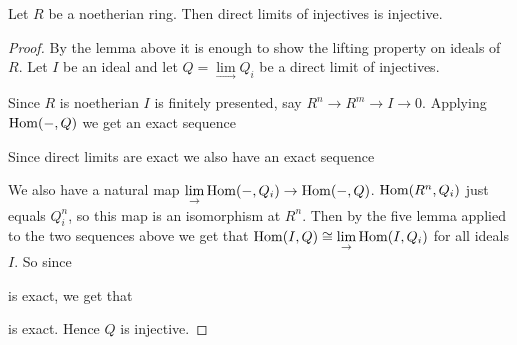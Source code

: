 \begin{theorem}\cite[Chapter I, Exercise 8]{CE56}
	Let $R$ be a noetherian ring. Then direct limits of injectives is injective.
	\begin{proof}
		By the lemma above it is enough to show the lifting property on ideals of $R$. Let $I$ be an ideal and let $Q = \lim\limits_{\rightarrow} Q_i$ be a direct limit of injectives.
		
		Since $R$ is noetherian $I$ is finitely presented, say $R^n \to R^m \to I \to 0$. Applying $\operatorname{Hom}(-,Q)$ we get an exact sequence 
		\begin{center}
		\end{center}
		Since direct limits are exact we also have an exact sequence
		\begin{center}
		\end{center}
		We also have a natural map $\lim\limits_{\rightarrow}\operatorname{Hom}(-, Q_i) \to \operatorname{Hom}(-, Q)$. $\operatorname{Hom}(R^n, Q_i)$ just equals $Q_i^n$, so this map is an isomorphism at $R^n$. Then by the five lemma applied to the two sequences above we get that $\operatorname{Hom}(I, Q) \cong \lim\limits_{\rightarrow}\operatorname{Hom}(I, Q_i)$ for all ideals $I$. So since 
		\begin{center}
		\end{center}
		is exact, we get that
		\begin{center}
		\end{center}
		is exact. Hence $Q$ is injective.
	\end{proof}
\end{theorem}


